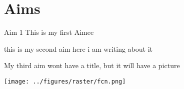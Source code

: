 \documentclass[
  american,
  ignorenonframetext,
  aspectratio=169]{beamer}
\begin{document}
\hypertarget{aims}{%
\section{Aims}\label{aims}}

\begin{frame}{Aim 1}
\protect\hypertarget{aim-1}{}
This is my first Aimee
\end{frame}

\begin{frame}{this is my second aim}
\protect\hypertarget{this-is-my-second-aim}{}
here i am writing about it
\end{frame}

\begin{frame}
My third aim wont have a title, but it will have a
picture

\texttt{[image: ../figures/raster/fcn.png]}
\end{frame}
\end{document}
